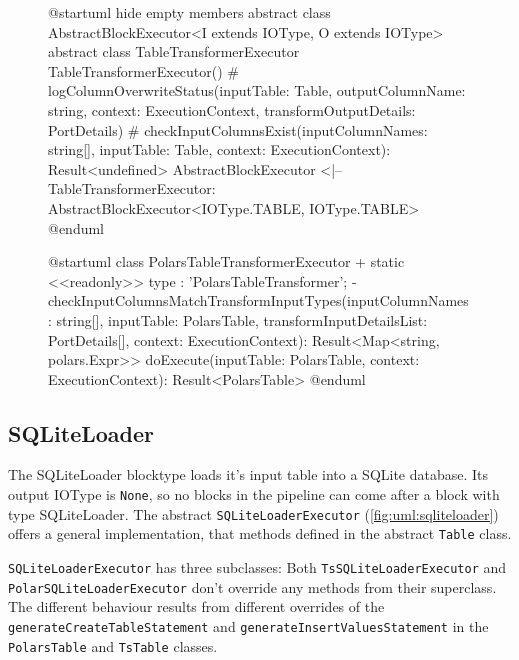 \begin{figure}
	\begin{plantuml}
		@startuml
		hide empty members
		abstract class AbstractBlockExecutor<I extends IOType, O extends IOType>
		abstract class TableTransformerExecutor {
				TableTransformerExecutor()
				# logColumnOverwriteStatus(inputTable: Table, outputColumnName: string, context: ExecutionContext, transformOutputDetails: PortDetails)
				# checkInputColumnsExist(inputColumnNames: string[], inputTable: Table, context: ExecutionContext): Result<undefined>
			}
		AbstractBlockExecutor <|-- TableTransformerExecutor: AbstractBlockExecutor<IOType.TABLE, IOType.TABLE>
		@enduml
	\end{plantuml}
	\caption{}
	\label{fig:uml:tabletransformer}
\end{figure}
\begin{figure}
	\begin{plantuml}
		@startuml
		class PolarsTableTransformerExecutor  {
		+ {static} <<readonly>> type : 'PolarsTableTransformer';
		- checkInputColumnsMatchTransformInputTypes(inputColumnNames: string[], inputTable: PolarsTable, transformInputDetailsList: PortDetails[], context: ExecutionContext): Result<Map<string, polars.Expr>>
		doExecute(inputTable: PolarsTable, context: ExecutionContext): Result<PolarsTable>
		}
		@enduml
	\end{plantuml}
	\caption{}
	\label{fig:uml:polarstabletransformer}
\end{figure}

\subsection{SQLiteLoader}
The SQLiteLoader blocktype loads it's input table into a SQLite database.
Its output IOType is \Verb|None|, so no blocks in the pipeline can come after a block with type SQLiteLoader.
The abstract \Verb|SQLiteLoaderExecutor| (\ref{fig:uml:sqliteloader}) offers a general implementation, that methods defined in the abstract \Verb|Table| class.

\Verb|SQLiteLoaderExecutor| has three subclasses:
Both \Verb|TsSQLiteLoaderExecutor| and \Verb|PolarSQLiteLoaderExecutor| don't override any methods from their superclass.
The different behaviour results from different overrides of the \Verb|generateCreateTableStatement| and \Verb|generateInsertValuesStatement| in the \Verb|PolarsTable| and \Verb|TsTable| classes.

